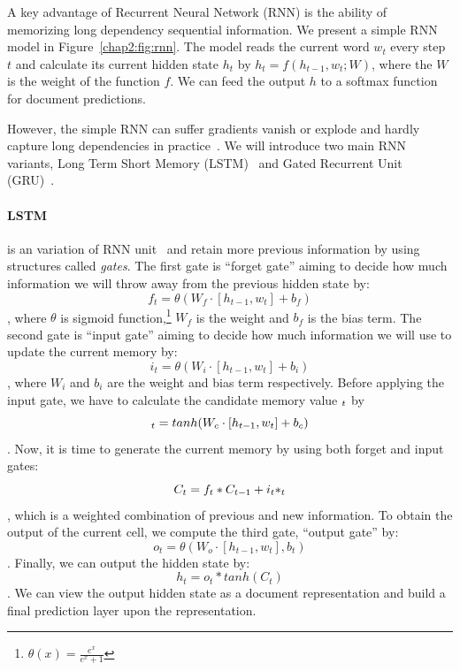 A key advantage of Recurrent Neural Network (RNN) is the ability of memorizing long dependency sequential information. 
We present a simple RNN model in Figure~\ref{chap2:fig:rnn}.
The model reads the current word $w_t$ every step $t$ and calculate its current hidden state $h_t$ by $h_t = f(h_{t-1}, w_t; W)$, where the $W$ is the weight of the function $f$.
We can feed the output $h$ to a softmax function for document predictions.

However, the simple RNN can suffer gradients vanish or explode and hardly capture long dependencies in practice~\cite{pascanu2013difficulty}.
We will introduce two main RNN variants, Long Term Short Memory (LSTM)~\cite{hochreiter1997long} and Gated Recurrent Unit (GRU)~\cite{chung2014empirical}.

\paragraph{LSTM} is an variation of RNN unit~\cite{hochreiter1997long} and retain more previous information by using structures called \textit{gates}.
The first gate is ``forget gate'' aiming to decide how much information we will throw away from the previous hidden state by:
$$f_t = \theta(W_f \cdot [h_{t-1}, w_t] + b_f)$$
, where $\theta$ is sigmoid function,\footnote{$\theta(x) = \frac{e^x}{e^x+1}$} $W_f$ is the weight and $b_f$ is the bias term.
The second gate is ``input gate'' aiming to decide how much information we will use to update the current memory by:
$$i_t = \theta(W_i \cdot [h_{t-1}, w_t] + b_i)$$
, where $W_i$ and $b_i$ are the weight and bias term respectively.
Before applying the input gate, we have to calculate the candidate memory value $\title{C}_t$ by $$\title{C}_t = tanh(W_c \cdot [h_{t-1}, w_t] + b_c)$$.
Now, it is time to generate the current memory by using both forget and input gates:
$$C_t = f_t * C_{t-1} + i_t * \title{C}_t$$, which is a weighted combination of previous and new information.
To obtain the output of the current cell, we compute the third gate, ``output gate'' by:
$$o_t = \theta(W_o \cdot [h_{t-1}, w_t], b_t)$$.
Finally, we can output the hidden state by:
$$h_t = o_t * tanh(C_t)$$.
We can view the output hidden state as a document representation and build a final prediction layer upon the representation.



